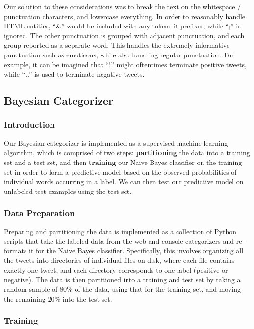 \documentclass[12pt,a4paper]{article}
\begin{document}
Our solution to these considerations was to break the text on the whitespace / punctuation characters, and lowercase everything.  In order to reasonably handle HTML entities, ``\&'' would be included with any tokens it prefixes, while ``;'' is ignored.  The other punctuation is grouped with adjacent punctuation, and each group reported as a separate word.  This handles the extremely informative punctuation such as emoticons, while also handling regular punctuation.  For example, it can be imagined that ``!'' might oftentimes terminate positive tweets, while ``...'' is used to terminate negative tweets.

\subsection { Bayesian Categorizer }

\subsubsection { Introduction }

Our Bayesian categorizer is implemented as a supervised machine learning algorithm, which is comprised of two steps: \textbf{partitioning} the data into a training set and a test set, and then \textbf{training} our Naive Bayes classifier on the training set in order to form a predictive model based on the observed probabilities of individual words occurring in a label. We can then test our predictive model on unlabeled test examples using the test set.

\subsubsection { Data Preparation }

Preparing and partitioning the data is implemented as a collection of Python scripts that take the labeled data from the web and console categorizers and re-formats it for the Naive Bayes classifier. Specifically, this involves organizing all the tweets into directories of individual files on disk, where each file contains exactly one tweet, and each directory corresponds to one label (positive or negative). The data is then partitioned into a training and test set by taking a random sample of 80\% of the data, using that for the training set, and moving the remaining 20\% into the test set.

\subsubsection { Training }
\end{document}
